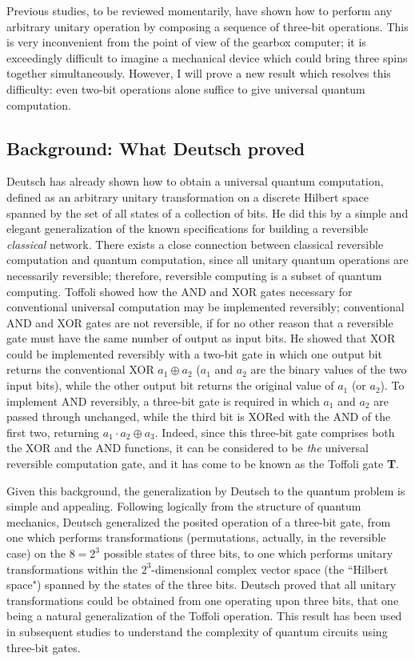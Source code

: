 Previous studies, to be reviewed momentarily, have shown how to perform
any arbitrary unitary operation by composing a sequence of three-bit
operations.  This is very inconvenient from the point of view of the
gearbox computer; it is exceedingly difficult to imagine a mechanical
device which could bring three spins together simultaneously.  However,
I will prove a new result which resolves this difficulty: even two-bit
operations alone suffice to give universal quantum computation.

\subsection{Background: What Deutsch proved}
\label{sec:level2}

Deutsch \cite{Deutsch89} has already shown how to obtain a universal
quantum computation, defined as an arbitrary unitary transformation
on a discrete Hilbert space spanned by the set of all states of a
collection of bits.
He did this by a simple and elegant generalization of the known specifications
for building a reversible {\em classical} network.
There exists a close connection between
classical reversible computation and quantum computation, since all
unitary quantum operations are necessarily reversible; therefore, reversible
computing is a subset of quantum computing.  Toffoli\cite{Toffoli80}
showed how the AND and XOR gates necessary for conventional universal
computation may be implemented reversibly; conventional AND and XOR
gates are not reversible, if for no other reason that a reversible gate
must have the same number of output as input bits.  He showed that XOR
could be implemented reversibly with a two-bit gate in which one output
bit returns the conventional XOR $a_1\oplus a_2$ ($a_1$ and $a_2$
are the binary
values of the two input bits), while the other output bit returns the
original value of $a_1$ (or $a_2$).  To implement AND reversibly, a three-bit
gate is required in which $a_1$ and $a_2$ are passed through unchanged, while
the third bit is XORed with the AND of the first two, returning $a_1\cdot a_2
\oplus a_3$.  Indeed, since this three-bit gate comprises both the XOR and the
AND functions, it can be considered to be {\em the} universal reversible
computation gate, and it has come to be known as the Toffoli gate {\bf T}.

Given this background, the generalization by Deutsch to the quantum
problem is simple and appealing.  Following logically from the structure
of quantum mechanics, Deutsch generalized the posited operation of a
three-bit gate, from one which performs transformations (permutations,
actually, in the reversible case) on the $8=2^3$ possible states of three
bits, to one which performs unitary transformations within the
$2^3$-dimensional complex vector space (the ``Hilbert space") spanned
by the states of the three bits.  Deutsch proved that all unitary
transformations could be obtained from one operating upon three bits,
that one being a natural generalization of the Toffoli operation.
This result has been used in subsequent studies\cite{Yao} to understand the
complexity of quantum circuits using three-bit gates.

